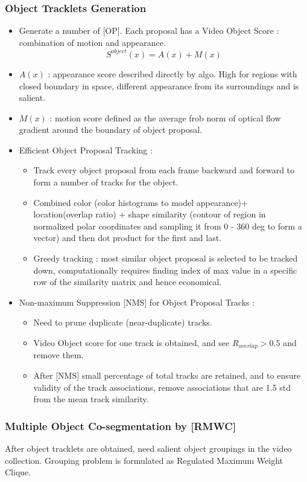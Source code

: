 \documentclass{article}
\begin{document}
\subsubsection{Object Tracklets Generation}
\begin{itemize}
\item Generate a number of [OP]. Each proposal has a Video Object Score : combination of motion and appearance. $$S^{object}(x) = A(x) + M(x)$$
\item $A(x)$ : appearance score described directly by algo. High for regions with closed boundary in space, different appearance from its surroundings and is salient.
\item $M(x)$ : motion score defined as the average frob norm of optical flow gradient around the boundary of object proposal.
\item Efficient Object Proposal Tracking :
  \begin{itemize}
  \item Track every object proposal from each frame backward and forward to form a number of tracks for the object.
  \item Combined color (color histograms to model appearance)+ location(overlap ratio) + shape similarity (contour of region in normalized polar coordinates and sampling it from 0 - 360 deg to form a vector) and then dot product for the first and last.
  \item Greedy tracking : most similar object proposal is selected to be tracked down, computationally requires finding index of max value in a specific row of the similarity matrix and hence economical.
  \end{itemize}
\item Non-maximum Suppression [NMS] for Object Proposal Tracks :
  \begin{itemize}
  \item Need to prune duplicate (near-duplicate) tracks.
  \item Video Object score for one track is obtained, and see $R_{overlap} > 0.5$ and remove them.
  \item After [NMS] small percentage of total tracks are retained, and to ensure validity of the track associations, remove associations that are 1.5 std from the mean track similarity.
  \end{itemize}
\end{itemize}

\subsubsection{Multiple Object Co-segmentation by [RMWC]}
After object tracklets are obtained, need salient object groupings in the video collection. Grouping problem is formulated as Regulated Maximum Weight Clique.
\end{document}
